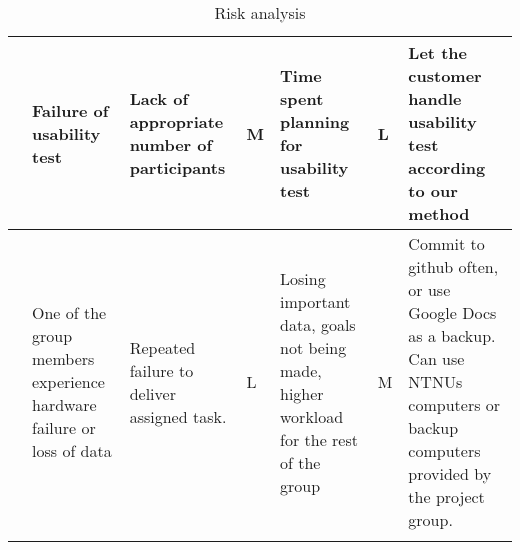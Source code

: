 \begin{landscape}
\begin{longtable}{| p{0.4cm} | p{4cm} | p{4cm} | p{2cm} | p{4cm} | p{1cm} | p{4cm} |}
	\stepcounter{riskId}
	\centering
		\arabic{riskId} &
		Failure of usability test &
		Lack of appropriate number of participants &
		\centering M &
		 Time spent planning for usability test &
		\centering L &
        Let the customer handle usability test according to our method \\
	\hline

	\stepcounter{riskId}
	\centering
		\arabic{riskId} &
		One of the group members experience hardware failure or loss of data &
        Repeated failure to deliver assigned task.
		& \centering L &
		Losing important data, goals not being made, higher workload for the
		rest of the group &
		\centering M &
		Commit to github often, or use Google Docs as a backup. Can use NTNUs
		computers or backup computers provided by the project group. \\
	\hline
\caption{Risk analysis}
\end{longtable}

\end{landscape}
